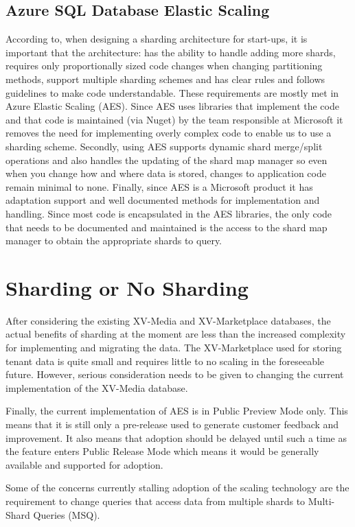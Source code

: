  
 \subsection{Azure SQL Database Elastic Scaling}
 
According to\cite{Ries2009-td}, when designing a sharding architecture for start-ups, it is important that the architecture: has the ability to handle adding more shards, requires only proportionally sized code changes when changing partitioning methods, support multiple sharding schemes and has clear rules and follows guidelines to make code understandable.
These requirements are mostly met in Azure Elastic Scaling (AES). Since AES uses libraries that implement the code and that code is maintained (via Nuget) by the team responsible at Microsoft it removes the need for implementing overly complex code to enable us to use a sharding scheme. Secondly, using AES supports dynamic shard merge/split operations and also handles the updating of the shard map manager so even when you change how and where data is stored, changes to application code remain minimal to none. Finally, since AES is a Microsoft product it has adaptation support and well documented methods for implementation and handling. Since most code is encapsulated in the AES libraries, the only code that needs to be documented and maintained is the access to the shard map manager to obtain the appropriate shards to query.

\section{Sharding or No Sharding}

After considering the existing XV-Media and XV-Marketplace databases, the actual benefits of sharding at the moment are less than the increased complexity for implementing and migrating the data. The XV-Marketplace used for storing tenant data is quite small and requires little to no scaling in the foreseeable future. However, serious consideration needs to be given to changing the current implementation of the XV-Media database.
 
Finally, the current implementation of AES is in Public Preview Mode only. This means that it is still only a pre-release used to generate customer feedback and improvement. It also means that adoption should be delayed until such a time as the feature enters Public Release Mode which means it would be generally available and supported for adoption.
 
Some of the concerns currently stalling adoption of the scaling technology are the requirement to change queries that access data from multiple shards to Multi-Shard Queries (MSQ).

